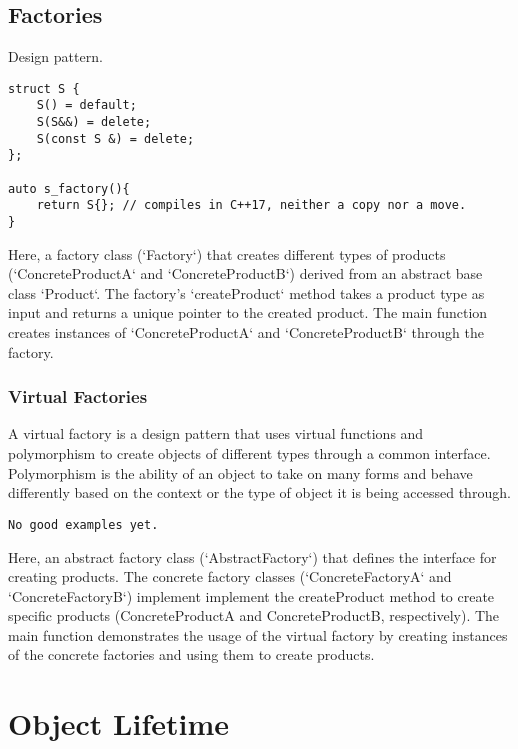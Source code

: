 \section{Factories}

Design pattern.

\begin{verbatim}
struct S {
    S() = default;
    S(S&&) = delete;
    S(const S &) = delete;
};

auto s_factory(){
    return S{}; // compiles in C++17, neither a copy nor a move.
}
\end{verbatim}

Here, a factory class (`Factory`) that creates different types of products
(`ConcreteProductA` and `ConcreteProductB`) derived from an abstract base class `Product`.
The factory's `createProduct` method takes a product type as input and returns a unique pointer to the created product.
The main function creates instances of `ConcreteProductA` and `ConcreteProductB` through the factory.

\subsection{Virtual Factories}

A virtual factory is a design pattern that uses virtual functions and 
polymorphism to create objects of different types through a common interface.
Polymorphism is the ability of an object to take on many forms
and behave differently based on the context or the type of object it is being accessed through.

\begin{verbatim}
No good examples yet.
\end{verbatim}

Here, an abstract factory class (`AbstractFactory`) that defines the interface for creating products.
The concrete factory classes (`ConcreteFactoryA` and `ConcreteFactoryB`) implement
implement the createProduct method to create specific products (ConcreteProductA and ConcreteProductB, respectively).
The main function demonstrates the usage of 
the virtual factory by creating instances of the concrete factories and using them to create products.

\chapter{Object Lifetime}

